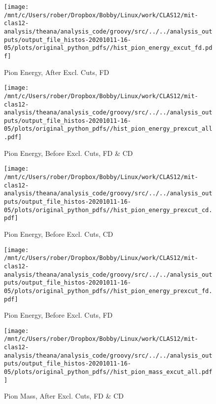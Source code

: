 \documentclass{article}
\begin{document}
\begin{landscape}
    \begin{figure}[h]
        \centering

        \texttt{[image: /mnt/c/Users/rober/Dropbox/Bobby/Linux/work/CLAS12/mit-clas12-analysis/theana/analysis\_code/groovy/src/../../analysis\_outputs/output\_file\_histos-20201011-16-05/plots/original\_python\_pdfs//hist\_pion\_energy\_excut\_fd.pdf]}
        \captionsetup{textformat=empty,labelformat=blank}
        \caption{Pion Energy, After Excl. Cuts, FD}
    \end{figure}
    \clearpage
    
    \begin{figure}[h]
        \centering

        \texttt{[image: /mnt/c/Users/rober/Dropbox/Bobby/Linux/work/CLAS12/mit-clas12-analysis/theana/analysis\_code/groovy/src/../../analysis\_outputs/output\_file\_histos-20201011-16-05/plots/original\_python\_pdfs//hist\_pion\_energy\_prexcut\_all.pdf]}
        \captionsetup{textformat=empty,labelformat=blank}
        \caption{Pion Energy, Before Excl. Cuts, FD \& CD}
    \end{figure}
    \clearpage
    
    \begin{figure}[h]
        \centering

        \texttt{[image: /mnt/c/Users/rober/Dropbox/Bobby/Linux/work/CLAS12/mit-clas12-analysis/theana/analysis\_code/groovy/src/../../analysis\_outputs/output\_file\_histos-20201011-16-05/plots/original\_python\_pdfs//hist\_pion\_energy\_prexcut\_cd.pdf]}
        \captionsetup{textformat=empty,labelformat=blank}
        \caption{Pion Energy, Before Excl. Cuts, CD}
    \end{figure}
    \clearpage
    
    \begin{figure}[h]
        \centering

        \texttt{[image: /mnt/c/Users/rober/Dropbox/Bobby/Linux/work/CLAS12/mit-clas12-analysis/theana/analysis\_code/groovy/src/../../analysis\_outputs/output\_file\_histos-20201011-16-05/plots/original\_python\_pdfs//hist\_pion\_energy\_prexcut\_fd.pdf]}
        \captionsetup{textformat=empty,labelformat=blank}
        \caption{Pion Energy, Before Excl. Cuts, FD}
    \end{figure}
    \clearpage
    
    \begin{figure}[h]
        \centering

        \texttt{[image: /mnt/c/Users/rober/Dropbox/Bobby/Linux/work/CLAS12/mit-clas12-analysis/theana/analysis\_code/groovy/src/../../analysis\_outputs/output\_file\_histos-20201011-16-05/plots/original\_python\_pdfs//hist\_pion\_mass\_excut\_all.pdf]}
        \captionsetup{textformat=empty,labelformat=blank}
        \caption{Pion Mass, After Excl. Cuts, FD \& CD}
    \end{figure}
    \clearpage
    

\end{landscape}
\end{document}
